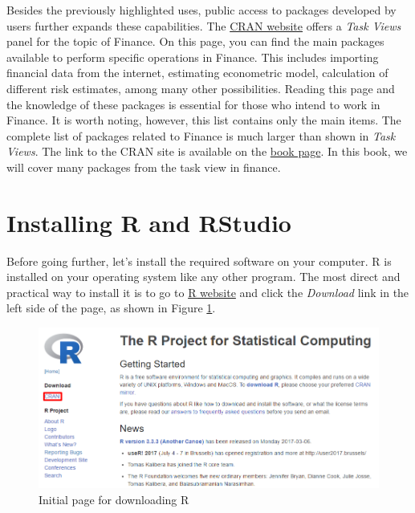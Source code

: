 \documentclass[11pt,]{book}
\begin{document}
Besides the previously highlighted uses, public access to packages
developed by users further expands these capabilities. The
\href{https://cran.r-project.org/web/views/Finance.html}{CRAN website}
offers a \emph{Task Views} panel for the topic of Finance. On this page,
you can find the main packages available to perform specific operations
in Finance. This includes importing financial data from the internet,
estimating econometric model, calculation of different risk estimates,
among many other possibilities. Reading this page and the knowledge of
these packages is essential for those who intend to work in Finance. It
is worth noting, however, this list contains only the main items. The
complete list of packages related to Finance is much larger than shown
in \emph{Task Views}. The link to the CRAN site is available on the
\href{https://sites.google.com/view/pmfdr/home}{book page}. In this
book, we will cover many packages from the task view in finance.

\section{Installing R and RStudio}\label{installing-r-and-rstudio}

Before going further, let's install the required software on your
computer. R is installed on your operating system like any other
program. The most direct and practical way to install it is to go to
\href{http://www.r-project.org/}{R website} and click the
\emph{Download} link in the left side of the page, as shown in Figure
\ref{fig:website-cran-1}.

\begin{figure}[!htbp]

{\centering \includegraphics[width=1\linewidth]{figs/website_cran_1} 

}

\caption{Initial page for downloading R}\label{fig:website-cran-1}
\end{figure}
\end{document}
